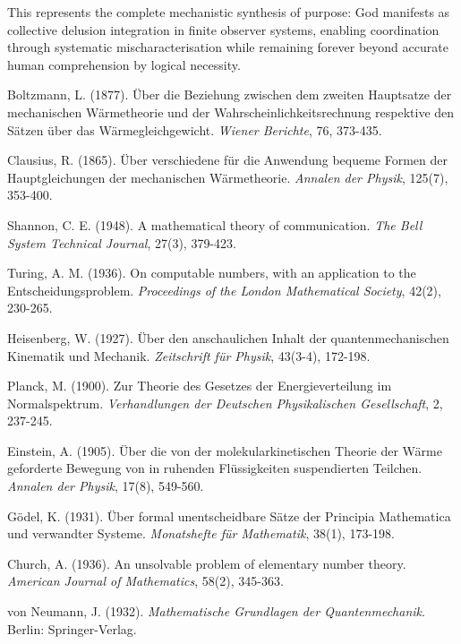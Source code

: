 \documentclass[12pt,a4paper]{article}
\begin{document}
This represents the complete mechanistic synthesis of purpose: God manifests as collective delusion integration in finite observer systems, enabling coordination through systematic mischaracterisation while remaining forever beyond accurate human comprehension by logical necessity.



\begin{thebibliography}{20}

Boltzmann, L. (1877). Über die Beziehung zwischen dem zweiten Hauptsatze der mechanischen Wärmetheorie und der Wahrscheinlichkeitsrechnung respektive den Sätzen über das Wärmegleichgewicht. \textit{Wiener Berichte}, 76, 373-435.

Clausius, R. (1865). Über verschiedene für die Anwendung bequeme Formen der Hauptgleichungen der mechanischen Wärmetheorie. \textit{Annalen der Physik}, 125(7), 353-400.

Shannon, C. E. (1948). A mathematical theory of communication. \textit{The Bell System Technical Journal}, 27(3), 379-423.

Turing, A. M. (1936). On computable numbers, with an application to the Entscheidungsproblem. \textit{Proceedings of the London Mathematical Society}, 42(2), 230-265.

Heisenberg, W. (1927). Über den anschaulichen Inhalt der quantenmechanischen Kinematik und Mechanik. \textit{Zeitschrift für Physik}, 43(3-4), 172-198.

Planck, M. (1900). Zur Theorie des Gesetzes der Energieverteilung im Normalspektrum. \textit{Verhandlungen der Deutschen Physikalischen Gesellschaft}, 2, 237-245.

Einstein, A. (1905). Über die von der molekularkinetischen Theorie der Wärme geforderte Bewegung von in ruhenden Flüssigkeiten suspendierten Teilchen. \textit{Annalen der Physik}, 17(8), 549-560.

Gödel, K. (1931). Über formal unentscheidbare Sätze der Principia Mathematica und verwandter Systeme. \textit{Monatshefte für Mathematik}, 38(1), 173-198.

Church, A. (1936). An unsolvable problem of elementary number theory. \textit{American Journal of Mathematics}, 58(2), 345-363.

von Neumann, J. (1932). \textit{Mathematische Grundlagen der Quantenmechanik}. Berlin: Springer-Verlag.


\end{thebibliography}
\end{document}
